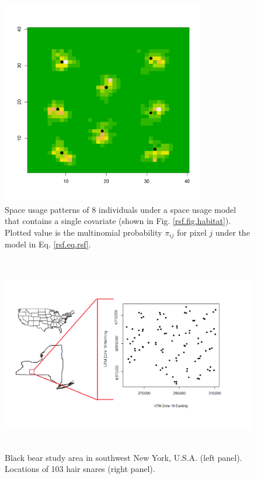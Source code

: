 \documentclass[12pt]{article}
\begin{document}
\begin{figure}
\centering
\includegraphics[width=3.5in,height=3.5in]{figs/homeranges8}
\caption{Space usage patterns of 8 individuals under a space usage
  model that contains a single covariate (shown in
  Fig. \ref{rsf.fig.habitat}). Plotted value is the multinomial
  probability $\pi_{ij}$ for pixel $j$ under the model in Eq. \ref{rsf.eq.rsf}.
}
\label{rsf.fig.homeranges}
\end{figure}

\begin{figure}
\centering
\includegraphics[width=5.6in,height=3.4in]{figs/US_NYS_studyArea.png}
\caption{Black bear study area in southwest New York, U.S.A. (left
  panel). 
Locations of 103 hair snares (right panel).}
\label{rsf.fig.studyarea}
\end{figure}
\end{document}
